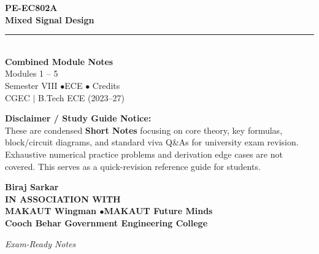 \documentclass[12pt,a4paper]{article}
\begin{document}
\thispagestyle{empty}


\vspace*{1.0cm}
\begin{center}
  {\Huge\bfseries\color{myred} PE-EC802A}\\[10pt]
  {\LARGE\bfseries\color{mydark} Mixed Signal Design}\\[20pt]
  {\color{myred}\rule{0.7\linewidth}{1.5pt}}\\[18pt]
  {\Large\color{myteal}\textbf{Combined Module Notes}}\\[8pt]
  {\large\color{mydark} Modules 1 -- 5}\\[40pt]
  {\normalsize\color{mydark} Semester VIII \quad$\bullet$\quad ECE \quad$\bullet$ Credits}\\[12pt]
  {\normalsize\color{mydark} CGEC \;$|$\; B.Tech ECE (2023--27)}
\end{center}
\vspace{1.0cm}
\begin{center}
  \begin{tcolorbox}[colback=mygray, colframe=mgframe, boxrule=0.5pt, arc=3pt, width=0.85\linewidth]
    \centering\small\color{mydark}
    \textbf{Disclaimer / Study Guide Notice:}\\
    These are condensed \textbf{Short Notes} focusing on core theory, key formulas, block/circuit diagrams, and standard viva Q\&As for university exam revision. Exhaustive numerical practice problems and derivation edge cases are not covered. This serves as a quick-revision reference guide for students.
  \end{tcolorbox}
\end{center}
\vfill
\vspace{0.6cm}
\begin{center}
  {\large\bfseries\color{mypurple} Biraj Sarkar}\\[16pt]
  {\footnotesize\color{watermark}\textbf{IN ASSOCIATION WITH}}\\[8pt]
  {\small\bfseries\color{mydark} MAKAUT Wingman \quad$\bullet$\quad MAKAUT Future Minds}\\[12pt]
  {\large\bfseries\color{myteal} Cooch Behar Government Engineering College}
\end{center}
\vfill
\begin{center}{\small\color{watermark}\textit{Exam-Ready Notes}}\end{center}
\clearpage
\end{document}
